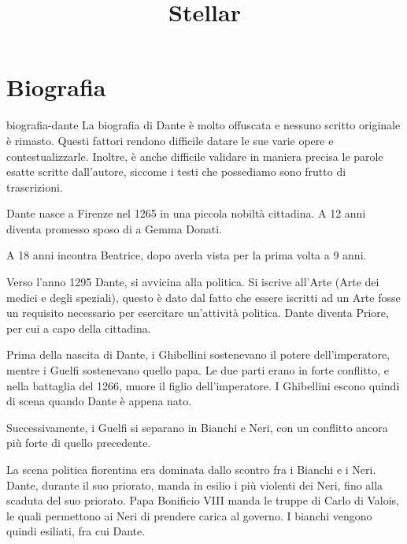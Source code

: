 \documentclass[preview]{standalone}
\begin{document}
\title{Stellar}
\genpage

\section{Biografia}

\begin{snippet}{biografia-dante}
    La biografia di Dante è molto offuscata e nessuno scritto originale è rimasto.
    Questi fattori rendono difficile datare le sue varie opere e contestualizzarle. Inoltre,
    è anche difficile validare in maniera precisa le parole esatte scritte dall'autore, siccome i testi che possediamo
    sono frutto di trascrizioni.
    
    Dante nasce a Firenze nel 1265 in una piccola nobiltà cittadina.
    A 12 anni diventa promesso sposo di a Gemma Donati.
    
    A 18 anni incontra Beatrice, dopo averla vista per la prima volta a 9 anni.
    
    Verso l'anno 1295 Dante, si avvicina alla politica.
    Si iscrive all'Arte (Arte dei medici e degli speziali), questo è dato dal fatto che essere iscritti ad un Arte
    fosse un requisito necessario per esercitare un'attività politica. Dante diventa Priore, per cui a capo della cittadina. %
    
    Prima della nascita di Dante, i Ghibellini sostenevano il potere dell'imperatore, mentre i Guelfi sostenevano quello papa.
    Le due parti erano in forte conflitto, e nella battaglia del 1266, muore il figlio dell'imperatore.
    I Ghibellini escono quindi di scena quando Dante è appena nato.
    
    Successivamente, i Guelfi si separano in Bianchi e Neri, con un conflitto ancora più forte di quello precedente.
    
    La scena politica fiorentina era dominata dallo scontro fra i Bianchi e i Neri.
    Dante, durante il suo priorato, manda in esilio i più violenti dei Neri, fino alla scaduta del suo priorato.
    Papa Bonificio VIII manda le truppe di Carlo di Valois, le quali permettono ai Neri di prendere carica al governo.
    I bianchi vengono quindi esiliati, fra cui Dante.
\end{snippet}
\end{document}
